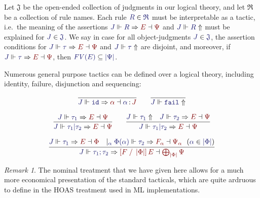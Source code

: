 \documentclass[11pt]{article}
\theoremstyle{definition}
\theoremstyle{remark}
\newtheorem{remark}[thm]{Remark}
\numberwithin{equation}{section}
\def\InputModeColorName{MidnightBlue}
\def\OutputModeColorName{Maroon}
\newcommand\InputMode[1]{{\color{\InputModeColorName}{#1}}}
\newcommand\OutputMode[1]{{\color{\OutputModeColorName}{#1}}}
\newcommand\HypJ[2]{#1\ \ (#2)}
\newcommand\GenJ[2]{\vert_{\InputMode{#1}}\; #2}
\newcommand\JJ{J}
\newcommand\RSet{\mathfrak{R}}
\newcommand\JSet{\mathfrak{J}}
\newcommand\IsTac[1]{\InputMode{#1}\ \textit{tactic}}
\newcommand\OSG[2]{\InputMode{#1}\,{\color{Black}:}\,\OutputMode{#2}}
\newcommand\Refine[4]{\InputMode{#1}\Vdash\InputMode{#2}\Rightarrow\OutputMode{#4}\dashv\OutputMode{#3}}
\newcommand\NoRefine[2]{\InputMode{#1}\Vdash\InputMode{#2}\Uparrow}
\newcommand\Member[2]{\InputMode{#1}\in\InputMode{#2}}
\newcommand\IdTac{\mathtt{id}}
\newcommand\FailTac{\mathtt{fail}}
\newcommand\OrElseTac[2]{#1\vert#2}
\newcommand\ThenTac[2]{#1;#2}
\newcommand\Dom[1]{\left\vert#1\right\vert}
\newcommand\SubsetEq[2]{\InputMode{#1}\subseteq\InputMode{#2}}
\newcommand\FV[1]{\textit{FV}\left(#1\right)}
\newcommand\Subst[3]{\left[#1\;/\;#2\right]#3}
\begin{document}
Let $\JSet$ be the open-ended collection of judgments in our logical theory,
and let $\RSet$ be a collection of rule names. Each rule $\Member{R}{\RSet}$
must be interpretable as a tactic, i.e.\ the meaning of the assertions
$\Refine{\JJ}{R}{\Psi}{E}$ and $\NoRefine{\JJ}{R}$ must be explained for
$\Member{J}{\JSet}$. We say \framebox{$\IsTac{\tau}$} in case for all object-judgments
$\Member{\JJ}{\JSet}$, the assertion conditions for
$\Refine{\JJ}{\tau}{\Psi}{E}$ and $\NoRefine{\JJ}{\tau}$ are disjoint, and
moreover, if $\Refine{\JJ}{\tau}{\Psi}{E}$, then
$\SubsetEq{\FV{E}}{\Dom{\Psi}}$.

Numerous general purpose tactics can be defined over a logical theory,
including identity, failure, disjunction and sequencing:

\begin{gather*}
  \infer{
    \Refine{\JJ}{\IdTac}{\OSG{\alpha}{\JJ}}{\alpha}
  }{
  }
  \qquad
  \infer{
    \NoRefine{\JJ}{\FailTac}
  }{
  }\\[6pt]
  \infer{
    \Refine{\JJ}{\OrElseTac{\tau_1}{\tau_2}}{\Psi}{E}
  }{
    \Refine{\JJ}{\tau_1}{\Psi}{E}
  }
  \qquad
  \infer{
    \Refine{\JJ}{\OrElseTac{\tau_1}{\tau_2}}{\Psi}{E}
  }{
    \NoRefine{\JJ}{\tau_1} &
    \Refine{\JJ}{\tau_2}{\Psi}{E}
  }\\[6pt]
  \infer{
    \Refine{\JJ}{\ThenTac{\tau_1}{\tau_2}}{\bigoplus_{\Dom\Phi}\Psi}{\Subst{F}{\Dom\Phi}{E}}
  }{
    \Refine{\JJ}{\tau_1}{\Phi}{E} &
    \GenJ{\alpha}{
      \HypJ{
        \Refine{\Phi(\alpha)}{\tau_2}{\Psi_\alpha}{F_\alpha}
      }{
        \Member{\alpha}{\Dom\Phi}
      }
    }
  }
\end{gather*}

\begin{remark}
  The nominal treatment that we have given here allows for a much more
  economical presentation of the standard tacticals, which are quite ardruous
  to define in the HOAS treatment used in ML implementations.
\end{remark}
\end{document}

